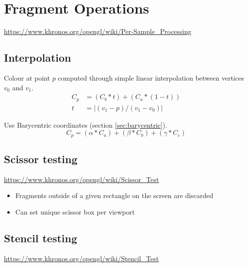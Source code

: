 \documentclass[a4paper]{article}
\begin{document}
\section{Fragment Operations}
\label{sec:fragment_operations}

\url{https://www.khronos.org/opengl/wiki/Per-Sample_Processing}

\subsection{Interpolation}


Colour at point $p$ computed through simple linear interpolation between
vertices $v_{0}$ and $v_{1}$.
\begin{align*}
  C_{p} &= (C_{b} * t) + (C_{a} * (1 - t)) \\
  t &= |(v_{1} - p) / (v_{1} - v_{0})|
\end{align*}


Use Barycentric coordinates (section \ref{sec:barycentric}).
\[
  C_{p} = (\alpha * C_{a}) + (\beta * C_{b}) + (\gamma * C_{c})
\]

\subsection{Scissor testing}

\url{https://www.khronos.org/opengl/wiki/Scissor_Test}

\begin{itemize}
  \item
    Fragments outside of a given rectangle on the screen are discarded

  \item
    Can set unique scissor box per viewport
\end{itemize}

\subsection{Stencil testing}

\url{https://www.khronos.org/opengl/wiki/Stencil_Test}
\end{document}
